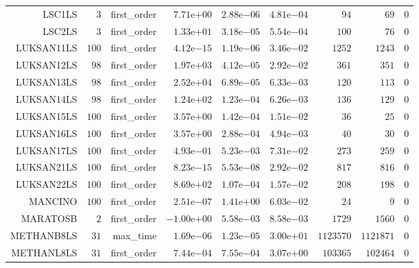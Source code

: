 \begin{longtable}{rrrrrrrrr}
LSC1LS & \(     3\) & first\_order & \( 7.71\)e\(+00\) & \( 2.88\)e\(-06\) & \( 4.81\)e\(-04\) & \(    94\) & \(    69\) & \(     0\) \\
LSC2LS & \(     3\) & first\_order & \( 1.33\)e\(+01\) & \( 3.18\)e\(-05\) & \( 5.54\)e\(-04\) & \(   100\) & \(    76\) & \(     0\) \\
LUKSAN11LS & \(   100\) & first\_order & \( 4.12\)e\(-15\) & \( 1.19\)e\(-06\) & \( 3.46\)e\(-02\) & \(  1252\) & \(  1243\) & \(     0\) \\
LUKSAN12LS & \(    98\) & first\_order & \( 1.97\)e\(+03\) & \( 4.12\)e\(-05\) & \( 2.92\)e\(-02\) & \(   361\) & \(   351\) & \(     0\) \\
LUKSAN13LS & \(    98\) & first\_order & \( 2.52\)e\(+04\) & \( 6.89\)e\(-05\) & \( 6.33\)e\(-03\) & \(   120\) & \(   113\) & \(     0\) \\
LUKSAN14LS & \(    98\) & first\_order & \( 1.24\)e\(+02\) & \( 1.23\)e\(-04\) & \( 6.26\)e\(-03\) & \(   136\) & \(   129\) & \(     0\) \\
LUKSAN15LS & \(   100\) & first\_order & \( 3.57\)e\(+00\) & \( 1.42\)e\(-04\) & \( 1.51\)e\(-02\) & \(    36\) & \(    25\) & \(     0\) \\
LUKSAN16LS & \(   100\) & first\_order & \( 3.57\)e\(+00\) & \( 2.88\)e\(-04\) & \( 4.94\)e\(-03\) & \(    40\) & \(    30\) & \(     0\) \\
LUKSAN17LS & \(   100\) & first\_order & \( 4.93\)e\(-01\) & \( 5.23\)e\(-03\) & \( 7.31\)e\(-02\) & \(   273\) & \(   259\) & \(     0\) \\
LUKSAN21LS & \(   100\) & first\_order & \( 8.23\)e\(-15\) & \( 5.53\)e\(-08\) & \( 2.92\)e\(-02\) & \(   817\) & \(   816\) & \(     0\) \\
LUKSAN22LS & \(   100\) & first\_order & \( 8.69\)e\(+02\) & \( 1.07\)e\(-04\) & \( 1.57\)e\(-02\) & \(   208\) & \(   198\) & \(     0\) \\
MANCINO & \(   100\) & first\_order & \( 2.51\)e\(-07\) & \( 1.41\)e\(+00\) & \( 6.03\)e\(-02\) & \(    24\) & \(     9\) & \(     0\) \\
MARATOSB & \(     2\) & first\_order & \(-1.00\)e\(+00\) & \( 5.58\)e\(-03\) & \( 8.58\)e\(-03\) & \(  1729\) & \(  1560\) & \(     0\) \\
METHANB8LS & \(    31\) & max\_time & \( 1.69\)e\(-06\) & \( 1.23\)e\(-05\) & \( 3.00\)e\(+01\) & \(1123570\) & \(1121871\) & \(     0\) \\
METHANL8LS & \(    31\) & first\_order & \( 7.44\)e\(-04\) & \( 7.55\)e\(-04\) & \( 3.07\)e\(+00\) & \(103365\) & \(102464\) & \(     0\) \\

\end{longtable}
